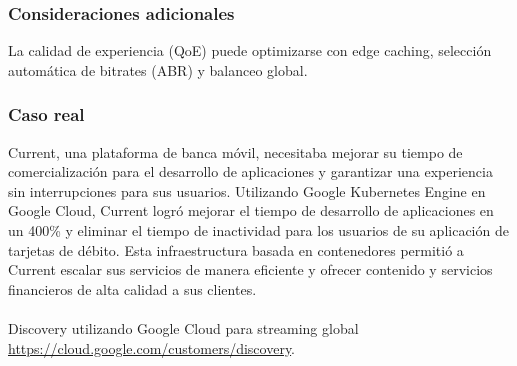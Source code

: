 {            \subsubsection{Consideraciones adicionales}
                La calidad de experiencia (QoE) puede optimizarse con edge caching, selección automática de bitrates (ABR) y balanceo global.

            \subsubsection{Caso real}
                Current, una plataforma de banca móvil, necesitaba mejorar su tiempo de comercialización para el desarrollo de aplicaciones y garantizar una experiencia sin interrupciones para sus usuarios. Utilizando Google Kubernetes Engine en Google Cloud, Current logró mejorar el tiempo de desarrollo de aplicaciones en un 400\% y eliminar el tiempo de inactividad para los usuarios de su aplicación de tarjetas de débito. Esta infraestructura basada en contenedores permitió a Current escalar sus servicios de manera eficiente y ofrecer contenido y servicios financieros de alta calidad a sus clientes.

                \paragraph{}Discovery utilizando Google Cloud para streaming global \href{https://cloud.google.com/customers/discovery}{https://cloud.google.com/customers/discovery}.
}